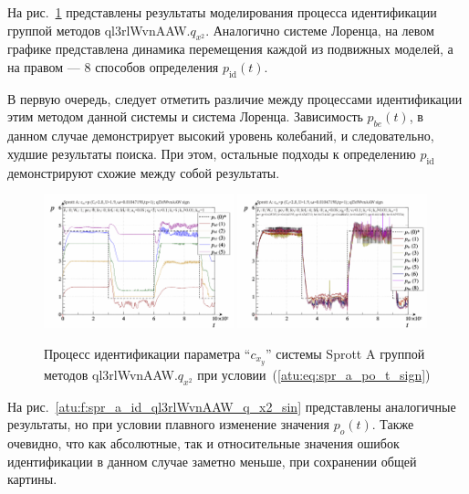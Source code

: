 На рис.~\ref{atu:f:spr_a_id_ql3rlWvnAAW_q_x2_sign} представлены результаты
моделирования процесса идентификации
группой методов ql3rlWvnAAW.$q_{x^2}$. Аналогично системе Лоренца, на левом графике представлена
динамика перемещения каждой из подвижных моделей,
а на правом --- 8 способов определения $p_\mathrm{id}(t)$.

В первую очередь, следует отметить различие между процессами
идентификации этим методом данной системы и система Лоренца.
Зависимость $p_{be}(t)$, в данном случае демонстрирует
высокий уровень колебаний, и следовательно,
худшие результаты поиска. При этом,
остальные подходы к определению $p_\mathrm{id}$
демонстрируют схожие между собой результаты.


\begin{figure}[htb!]
  \centerline{
    \includegraphics[width=0.49\textwidth]{p/cha/spr_a/ql3rlWvnAAW_x2/sprott_a_id-p_t_pi_ql3rlWvnAAW_sign.png}
    \hfill
    \includegraphics[width=0.49\textwidth]{p/cha/spr_a/ql3rlWvnAAW_x2/sprott_a_id-p_t_p_ql3rlWvnAAW_sign.png}
  }
  \caption{Процесс идентификации параметра ``$c_{x_y}$'' системы Sprott A группой методов ql3rlWvnAAW.$q_{x^2}$ при условии~(\ref{atu:eq:spr_a_po_t_sign})}
  \label{atu:f:spr_a_id_ql3rlWvnAAW_q_x2_sign}
\end{figure}

На рис.~\ref{atu:f:spr_a_id_ql3rlWvnAAW_q_x2_sin} представлены аналогичные результаты,
но при условии плавного изменение значения $p_o(t)$. Также очевидно, что
как абсолютные, так и относительные значения ошибок идентификации в данном случае заметно
меньше, при сохранении общей картины.

